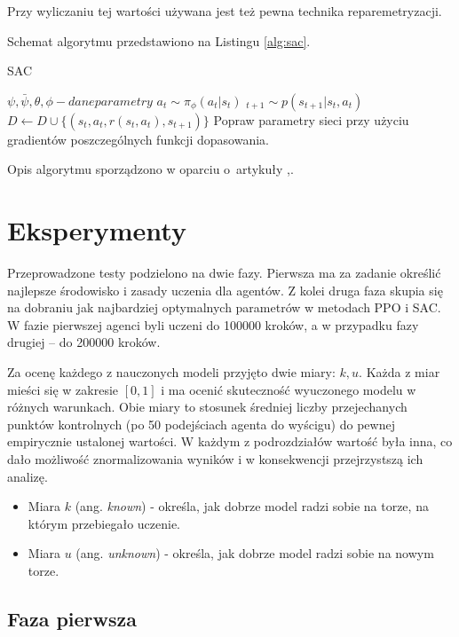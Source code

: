 \documentclass[a4paper,12pt]{article}
\let\oldsection\section
\renewcommand\section{\clearpage\oldsection}
\begin{document}
Przy wyliczaniu tej wartości używana jest też pewna technika reparemetryzacji.



Schemat algorytmu przedstawiono na Listingu \ref{alg:sac}.
\begin{algorithm}[h!]
	\caption{SAC}
	\label{alg:sac}
	\begin{algorithmic}[1]
		\STATE $\psi, \bar{\psi}, \theta,\phi - dane parametry$
				\STATE $a_t \sim \pi_{\phi}(a_t|s_t)$
				\STATE $_{t+1} \sim p(s_{t+1}|s_t,a_t)$
				\STATE $D \gets D \cup \{(s_t,a_t,r(s_t,a_t),s_{t+1})\}$
			\ENDFOR
		\ENDFOR
		\STATE Popraw parametry sieci przy użyciu gradientów poszczególnych funkcji dopasowania.
	\end{algorithmic}
\end{algorithm}

Opis algorytmu sporządzono w oparciu o~artykuły \cite{kumar},\cite{nieznany}.

\section{Eksperymenty}
Przeprowadzone testy podzielono na dwie fazy. Pierwsza ma za zadanie określić najlepsze środowisko i zasady uczenia dla agentów. Z kolei druga faza skupia się na dobraniu jak najbardziej optymalnych parametrów w metodach PPO i SAC. W fazie pierwszej agenci byli uczeni do 100000 kroków, a w przypadku fazy drugiej -- do 200000 kroków.

Za ocenę każdego z nauczonych modeli przyjęto dwie miary: $k, u$. Każda z miar mieści się w zakresie $[0,1]$ i ma ocenić skuteczność wyuczonego modelu w różnych warunkach. Obie miary to stosunek średniej liczby przejechanych punktów kontrolnych (po 50 podejściach agenta do wyścigu) do pewnej empirycznie ustalonej wartości. W każdym z podrozdziałów wartość była inna, co dało możliwość znormalizowania wyników i w konsekwencji przejrzystszą ich analizę.
\begin{itemize}
	\item Miara $k$ (ang. \textit{known}) - określa, jak dobrze model radzi sobie na torze, na którym przebiegało uczenie.
	\item Miara $u$ (ang. \textit{unknown}) - określa, jak dobrze model radzi sobie na nowym torze. 
\end{itemize}


\subsection{Faza pierwsza}
\end{document}
